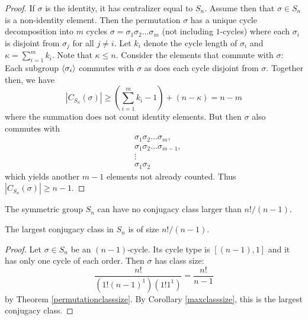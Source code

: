 \documentclass[main.tex]{subfiles}
\begin{document}
\begin{proof}
If $\sigma$ is the identity, it has centralizer equal to $S_n$. Assume then that $\sigma \in S_n$ is a non-identity element. Then the permutation $\sigma$ has a unique cycle decomposition into $m$ cycles $\sigma = \sigma_1 \sigma_2 \ldots \sigma_m$ (not including $1$-cycles) where each $\sigma_i$ is disjoint from $\sigma_j$ for all $j \ne i$. Let $k_i$ denote the cycle length of $\sigma_i$ and $\kappa = \sum_{i = 1}^m k_i$. Note that $\kappa \le n$. Consider the elements that commute with $\sigma$: Each subgroup $\langle \sigma_i \rangle$ commutes with $\sigma$ as does each cycle disjoint from $\sigma$. Together then, we have
$$|C_{S_n}(\sigma)| \ge \left(\sum_{i=1}^m k_i - 1\right) + (n - \kappa) = n - m$$
where the summation does not count identity elements. But then $\sigma$ also commutes with
\begin{align*}
&\sigma_1 \sigma_2 \ldots \sigma_m \text{,} \\
&\sigma_1 \sigma_2 \ldots \sigma_{m-1} \text{,} \\
&\vdots \\
&\sigma_1 \sigma_2
\end{align*}
which yields another $m-1$ elements not already counted. Thus $|C_{S_n}(\sigma)| \ge n-1$.
\end{proof}

\begin{corollary}\label{maxclasssize}
The symmetric group $S_n$ can have no conjugacy class larger than $n!/(n-1)$.
\end{corollary}

\begin{theorem}
The largest conjugacy class in $S_n$ is of size $n!/(n-1)$.
\end{theorem}

\begin{proof}
Let $\sigma \in S_n$ be an $(n-1)$-cycle. Its cycle type is $[(n-1), 1]$ and it has only one cycle of each order. Then $\sigma$ has class size:
$$\frac{n!}{(1!(n-1)^1)(1!1^1)} = \frac{n!}{n-1}$$
by Theorem \ref{permutationclasssize}. By Corollary \ref{maxclasssize}, this is the largest conjugacy class.
\end{proof}
\end{document}
